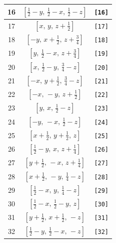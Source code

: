 \documentclass[fleqn,8pt]{jsarticle}
\begin{document}
\begin{longtable}{ccc}
16 & $\left[ \frac{1}{2} - y,\, \frac{1}{2} - x,\, \frac{1}{2} - z \right]$ & {\tt [16]} \\ \hline
17 & $\left[ x,\, y,\, z + \frac{1}{2} \right]$ & {\tt [17]} \\ \hline
18 & $\left[ - y,\, x + \frac{1}{2},\, z + \frac{3}{4} \right]$ & {\tt [18]} \\ \hline
19 & $\left[ y,\, \frac{1}{2} - x,\, z + \frac{3}{4} \right]$ & {\tt [19]} \\ \hline
20 & $\left[ x,\, \frac{1}{2} - y,\, \frac{3}{4} - z \right]$ & {\tt [20]} \\ \hline
21 & $\left[ - x,\, y + \frac{1}{2},\, \frac{3}{4} - z \right]$ & {\tt [21]} \\ \hline
22 & $\left[ - x,\, - y,\, z + \frac{1}{2} \right]$ & {\tt [22]} \\ \hline
23 & $\left[ y,\, x,\, \frac{1}{2} - z \right]$ & {\tt [23]} \\ \hline
24 & $\left[ - y,\, - x,\, \frac{1}{2} - z \right]$ & {\tt [24]} \\ \hline
25 & $\left[ x + \frac{1}{2},\, y + \frac{1}{2},\, z \right]$ & {\tt [25]} \\ \hline
26 & $\left[ \frac{1}{2} - y,\, x,\, z + \frac{1}{4} \right]$ & {\tt [26]} \\ \hline
27 & $\left[ y + \frac{1}{2},\, - x,\, z + \frac{1}{4} \right]$ & {\tt [27]} \\ \hline
28 & $\left[ x + \frac{1}{2},\, - y,\, \frac{1}{4} - z \right]$ & {\tt [28]} \\ \hline
29 & $\left[ \frac{1}{2} - x,\, y,\, \frac{1}{4} - z \right]$ & {\tt [29]} \\ \hline
30 & $\left[ \frac{1}{2} - x,\, \frac{1}{2} - y,\, z \right]$ & {\tt [30]} \\ \hline
31 & $\left[ y + \frac{1}{2},\, x + \frac{1}{2},\, - z \right]$ & {\tt [31]} \\ \hline
32 & $\left[ \frac{1}{2} - y,\, \frac{1}{2} - x,\, - z \right]$ & {\tt [32]} \\
\end{longtable}
\end{document}
